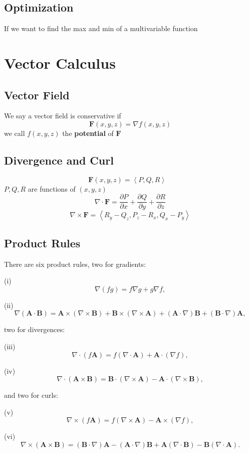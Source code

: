 \documentclass[12pt]{book}
\newcommand{\pypx}[2]{\frac{\partial #1}{\partial #2}}
\newcommand{\divg}{\nabla \cdot}
\newcommand{\curl}{\nabla \times}
\newcommand{\tribkt}[1]{\left< #1 \right>}
\begin{document}
\subsection{Optimization}
If we want to find the max and min of a multivariable function


\section{Vector Calculus}
\subsection{Vector Field}
We say a vector field is conservative if
\[
\textbf{F}(x,y,z) = \nabla f(x,y,z)
\]
we call $f(x,y,z)$ the \textbf{potential} of $\textbf{F}$

\subsection{Divergence and Curl}
\[
\textbf{F}(x,y,z) = \tribkt{P,Q,R} \;\;\;
\]
$P,Q,R$ are functions of $(x,y,z)$
\[
\divg \textbf{F} = \pypx{P}{x} + \pypx{Q}{y} + \pypx{R}{z}
\]
\[
\curl \textbf{F} = \tribkt{R_y - Q_z,P_z - R_x,Q_x - P_y}
\]
\subsection{Product Rules}
There are six product rules, two for gradients:

(i) \[
\nabla (fg) = f \nabla g + g \nabla f,
\]

(ii) \[
\nabla (\mathbf{A} \cdot \mathbf{B}) = \mathbf{A} \times (\nabla \times \mathbf{B}) + \mathbf{B} \times (\nabla \times \mathbf{A}) + (\mathbf{A} \cdot \nabla)\mathbf{B} + (\mathbf{B} \cdot \nabla)\mathbf{A},
\]

two for divergences:

(iii) \[
\nabla \cdot (f \mathbf{A}) = f (\nabla \cdot \mathbf{A}) + \mathbf{A} \cdot (\nabla f),
\]

(iv) \[
\nabla \cdot (\mathbf{A} \times \mathbf{B}) = \mathbf{B} \cdot (\nabla \times \mathbf{A}) - \mathbf{A} \cdot (\nabla \times \mathbf{B}),
\]

and two for curls:

(v) \[
\nabla \times (f \mathbf{A}) = f (\nabla \times \mathbf{A}) - \mathbf{A} \times (\nabla f),
\]

(vi) \[
\nabla \times (\mathbf{A} \times \mathbf{B}) = (\mathbf{B} \cdot \nabla)\mathbf{A} - (\mathbf{A} \cdot \nabla)\mathbf{B} + \mathbf{A} (\nabla \cdot \mathbf{B}) - \mathbf{B} (\nabla \cdot \mathbf{A}).
\]
\end{document}
